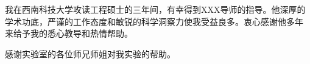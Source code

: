 \begin{acknowledgements}

我在西南科技大学攻读工程硕士的三年间，有幸得到XXX导师的指导。他深厚的
学术功底，严谨的工作态度和敏锐的科学洞察力使我受益良多。衷心感谢他多年
来给予我的悉心教导和热情帮助。

感谢实验室的各位师兄师姐对我实验的帮助。

\end{acknowledgements}
